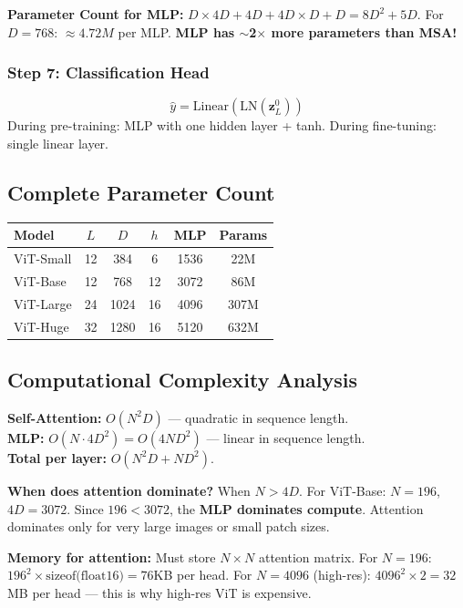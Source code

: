 \textbf{Parameter Count for MLP:}
$D \times 4D + 4D + 4D \times D + D = 8D^2 + 5D$. For $D{=}768$: $\approx 4.72M$ per MLP. \textbf{MLP has $\sim$2$\times$ more parameters than MSA!}

\subsubsection{Step 7: Classification Head}
$$\hat{y} = \text{Linear}(\text{LN}(\mathbf{z}_L^0))$$
During pre-training: MLP with one hidden layer + tanh. During fine-tuning: single linear layer.

\subsection{Complete Parameter Count}
\begin{center}\small
\begin{tabular}{lccccc}\toprule
\textbf{Model} & \textbf{$L$} & \textbf{$D$} & \textbf{$h$} & \textbf{MLP} & \textbf{Params} \\\midrule
ViT-Small & 12 & 384 & 6 & 1536 & 22M \\
ViT-Base & 12 & 768 & 12 & 3072 & 86M \\
ViT-Large & 24 & 1024 & 16 & 4096 & 307M \\
ViT-Huge & 32 & 1280 & 16 & 5120 & 632M \\
\bottomrule
\end{tabular}
\end{center}

\subsection{Computational Complexity Analysis}

\textbf{Self-Attention:} $O(N^2 D)$ — quadratic in sequence length.\\
\textbf{MLP:} $O(N \cdot 4D^2) = O(4ND^2)$ — linear in sequence length.\\
\textbf{Total per layer:} $O(N^2D + ND^2)$.

\textbf{When does attention dominate?} When $N > 4D$. For ViT-Base: $N{=}196$, $4D{=}3072$. Since $196 < 3072$, the \textbf{MLP dominates compute}. Attention dominates only for very large images or small patch sizes.

\textbf{Memory for attention:} Must store $N \times N$ attention matrix. For $N{=}196$: $196^2 \times \text{sizeof(float16)} = 76$KB per head. For $N{=}4096$ (high-res): $4096^2 \times 2 = 32$MB per head — this is why high-res ViT is expensive.

